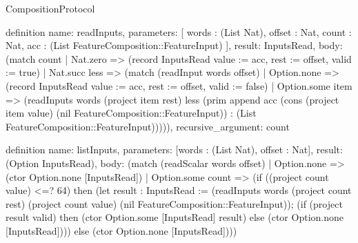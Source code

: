 \begin{lexlean}{CompositionProtocol}
\begin{semanticmodule}
definition{
  name: readInputs,
  parameters: [
    words : (List Nat),
    offset : Nat,
    count : Nat,
    acc : (List FeatureComposition::FeatureInput)
  ],
  result: InputsRead,
  body: (match count
    | Nat.zero => (record InputsRead {value := acc, rest := offset, valid := true})
    | Nat.succ less => (match (readInput words offset)
      | Option.none => (record InputsRead {value := acc, rest := offset, valid := false})
      | Option.some item => (readInputs words (project item rest) less (prim append acc (cons (project item value) (nil FeatureComposition::FeatureInput)) : (List FeatureComposition::FeatureInput))))),
  recursive_argument: count
}

definition{
  name: listInputs,
  parameters: [words : (List Nat), offset : Nat],
  result: (Option InputsRead),
  body: (match (readScalar words offset)
    | Option.none => (ctor Option.none [InputsRead])
    | Option.some count => (if ((project count value) <=? 64) then (let result : InputsRead := (readInputs words (project count rest) (project count value) (nil FeatureComposition::FeatureInput)); (if (project result valid) then (ctor Option.some [InputsRead] result) else (ctor Option.none [InputsRead]))) else (ctor Option.none [InputsRead])))
}


\end{semanticmodule}
\end{lexlean}
